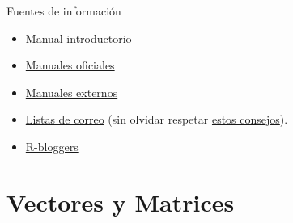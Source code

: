 \documentclass[xcolor={usenames,svgnames,dvipsnames}]{beamer}
\begin{document}
\begin{frame}[label=sec-1-3-1]{Fuentes de información}
\begin{itemize}
\item \href{http://cran.r-project.org/doc/manuals/R-intro.html}{Manual introductorio}
\item \href{http://cran.r-project.org/manuals.html}{Manuales oficiales}
\item \href{http://cran.r-project.org/other-docs.html}{Manuales externos}
\item \href{http://www.r-project.org/mail.html}{Listas de correo} (sin olvidar respetar \href{http://www.r-project.org/posting-guide.html}{estos consejos}).
\item \href{http://www.r-bloggers.com}{R-bloggers}
\end{itemize}
\end{frame}

\section{Vectores y Matrices}
\label{sec-2}
\end{document}
